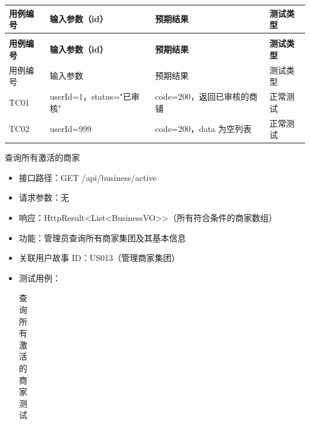 \begin{levellist}
\begin{levellist}
\begin{itemize}
\begin{longtable}{>{\centering\arraybackslash}m{2cm} >{\centering\arraybackslash}m{4cm} >{\centering\arraybackslash}m{5cm} >{\centering\arraybackslash}m{2cm}}
                      \toprule
                      \textbf{用例编号} & \textbf{输入参数（id）}     & \textbf{预期结果}      & \textbf{测试类型} \\
                      \midrule
                      \endfirsthead

                      \multicolumn{4}{c}{{\tablename\ \thetable{} 续表}}                           \\
                      \toprule
                      \textbf{用例编号} & \textbf{输入参数（id）}     & \textbf{预期结果}      & \textbf{测试类型} \\
                      \midrule
                      \endhead

                      \bottomrule
                      \endfoot


                      用例编号          & 输入参数                  & 预期结果               & 测试类型          \\
                      TC01          & userId=1，status="已审核" & code=200，返回已审核的商铺  & 正常测试          \\
                      TC02          & userId=999            & code=200，data 为空列表 & 正常测试          \\
                  \end{longtable}
        \end{itemize}

        \item 查询所有激活的商家
        \begin{itemize}
            \item 接口路径：GET /api/business/active
            \item 请求参数：无
            \item 响应：HttpResult<List<BusinessVO>>（所有符合条件的商家数组）
            \item 功能：管理员查询所有商家集团及其基本信息
            \item 关联用户故事 ID：US013（管理商家集团）
            \item 测试用例：
                  \begin{longtable}{>{\centering\arraybackslash}m{1.7cm} >{\centering\arraybackslash}m{4cm} >{\centering\arraybackslash}m{5.5cm} >{\centering\arraybackslash}m{1.8cm}}

                      \caption{查询所有激活的商家测试} \label{tab:training}                           \\


\end{longtable}
\end{itemize}
\end{levellist}
\end{levellist}
